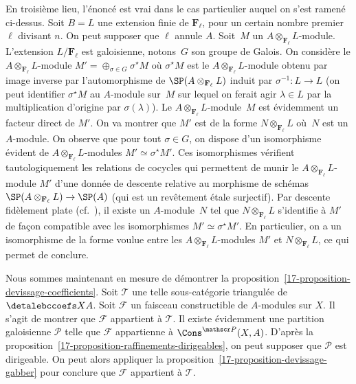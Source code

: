\documentclass[10pt]{../fichiers-configuration-latex/smfart}
\begin{document}
En troisième lieu, l'énoncé est vrai dans le cas particulier auquel on
s'est ramené ci-dessus. Soit $B=L$ une extension finie de
$\mathbf{F}_\ell$, pour un certain nombre premier $\ell$ divisant $n$. On
peut supposer que $\ell$ annule $A$.
Soit $M$ un
$A\otimes_{\mathbf{F}_\ell} L$-module. L'extension $L/\mathbf{F}_\ell$ est
galoisienne, notons $G$ son groupe de Galois.
On considère le $A\otimes_{\mathbf{F}_\ell} L$-module
$M'=\oplus_{\sigma\in G} \sigma^\star M$ où $\sigma^\star M$ est le
$A\otimes_{\mathbf{F}_\ell} L$-module obtenu par image inverse par
l'automorphisme de $\SP(A\otimes_{\mathbf{F}_\ell} L)$ induit par
$\sigma^{-1}\colon L\to L$ (on peut identifier $\sigma^\star M$ au
$A$-module sur $M$ sur lequel on ferait agir $\lambda\in L$ par la
multiplication d'origine par $\sigma(\lambda)$).
Le $A\otimes_{\mathbf{F}_\ell} L$-module $M$ est évidemment un facteur
direct de $M'$. On va montrer que $M'$ est de la forme
$N\otimes_{\mathbf{F}_\ell} L$ où $N$ est un $A$-module. On observe que
pour tout $\sigma\in G$, on dispose d'un isomorphisme évident de
$A\otimes_{\mathbf{F}_\ell}L$-modules $M'\simeq \sigma^\star M'$. Ces
isomorphismes vérifient tautologiquement les relations de cocycles qui
permettent de munir le $A\otimes_{\mathbf{F}_\ell} L$-module $M'$ d'une
donnée de descente relative au morphisme de schémas
$\SP(A\otimes_{\mathbf{F}_\ell} L)\to\SP(A)$ (qui est un revêtement étale
surjectif). Par descente fidèlement plate (cf.~),
il existe un $A$-module $N$ tel
que $N\otimes_{\mathbf{F}_\ell} L$ s'identifie à $M'$ de façon compatible
avec les isomorphismes $M'\simeq \sigma^\star M'$. En particulier, on a un
isomorphisme de la forme voulue entre les $A\otimes_{\mathbf{F}_\ell}
L$-modules $M'$ et $N\otimes_{\mathbf{F}_\ell} L$, ce qui permet de
conclure.

\bigskip

Nous sommes maintenant en mesure de démontrer la
proposition~\ref{17-proposition-devissage-coefficients}. Soit $\mathscr T$ une
telle sous-catégorie triangulée de $\detalebccoefs X A$. Soit $\mathscr F$ un
faisceau constructible de $A$-modules sur $X$. Il s'agit de montrer que
$\mathscr F$ appartient à $\mathscr T$. Il existe évidemment une partition
galoisienne $\mathscr P$ telle que $\mathscr F$ appartienne à
$\Cons^{\mathscr P}(X,A)$. D'après la
proposition~\ref{17-proposition-raffinements-dirigeables}, on peut supposer
que $\mathscr P$ est dirigeable. On peut alors appliquer la
proposition~\ref{17-proposition-devissage-gabber} pour conclure que $\mathscr
F$ appartient à $\mathscr T$.
\end{document}
